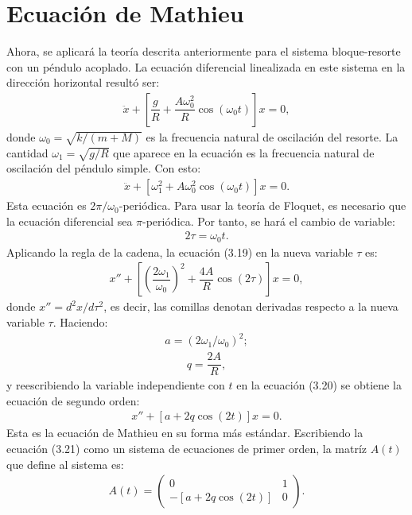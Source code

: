\section{Ecuación de Mathieu}
Ahora, se aplicará la teoría descrita anteriormente para el sistema bloque-resorte con un péndulo acoplado. La ecuación diferencial linealizada en este sistema en la dirección horizontal resultó ser:
\begin{eqnarray*}
\ddot{x}+\left[\dfrac{g}{R}+\dfrac{A\omega_{0}^{2}}{R}\cos\left( \omega_{0}t\right)  \right]x=0, 
\end{eqnarray*} 
donde $\omega_{0}=\sqrt{k/(m+M)}$ es la frecuencia natural de oscilación del resorte. La cantidad $\omega_{1}=\sqrt{g/R}$ que aparece en la ecuación es la frecuencia natural de oscilación del péndulo simple. Con esto:
\begin{eqnarray}
\ddot{x}+\left[\omega_{1}^{2}+A\omega_{0}^{2}\cos\left( \omega_{0}t\right)  \right]x=0.
\end{eqnarray} 
Esta ecuación es $2\pi / \omega_{0}$-periódica. Para usar la teoría de Floquet, es necesario que la ecuación diferencial sea $\pi$-periódica. Por tanto, se hará el cambio de variable:
\begin{eqnarray*}
2\tau=\omega_{0}t.
\end{eqnarray*}
Aplicando la regla de la cadena, la ecuación (3.19) en la nueva variable $\tau$ es:
\begin{eqnarray}
x''+\left[ \left( \dfrac{2\omega_{1}}{\omega_{0}}\right)^{2}+\dfrac{4A}{R}\cos\left( 2\tau\right)  \right]x=0, 
\end{eqnarray}
donde $x''=d^2x/d\tau^{2}$, es decir, las comillas denotan derivadas respecto a la nueva variable $\tau$. Haciendo:
\begin{eqnarray*}
a=\left(2\omega_{1}/\omega_{0}\right)^{2};
\end{eqnarray*}
\begin{eqnarray*}
q=\dfrac{2A}{R},
\end{eqnarray*}
y reescribiendo la variable independiente con $t$ en la ecuación (3.20) se obtiene la ecuación de segundo orden:
\begin{eqnarray}
x''+\left[a+2q\cos\left( 2t \right)  \right]x=0.
\end{eqnarray}
Esta es la ecuación de Mathieu en su forma más estándar. Escribiendo la ecuación (3.21) como un sistema de ecuaciones de primer orden, la matríz $A(t)$ que define al sistema es:
\begin{eqnarray*}
A(t)=\begin{pmatrix} 0 & 1 \\  -\left[a+2q\cos\left( 2t \right)  \right] & 0 \end{pmatrix}.
\end{eqnarray*}
